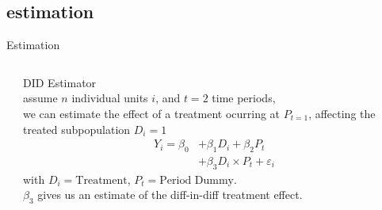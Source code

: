 \documentclass[aspectratio=169]{beamer}
\begin{document}
	\subsection{estimation}
		\begin{frame}{Estimation}
			\begin{columns}
				\begin{column}{0.66\textwidth}
					\begin{center}
					\end{center}
				\end{column}
				\begin{column}{0.33\textwidth}
					DID Estimator \\ \vspace*{.25cm}
					\footnotesize assume $n$ individual units $i$, and $t=2$ time periods, \\
					we can estimate the effect of a treatment ocurring at $P_{t=1}$,
					affecting the treated subpopulation $D_i=1$
					\begin{equation}
						\begin{split}
							Y_{i} = \beta_0 & + \beta_1 D_i + \beta_2 P_t \\
											& + \beta_3 D_i \times P_t + \varepsilon_{i}
						\end{split}
					\end{equation}
					\scriptsize{with $D_i = \text{Treatment}$, $P_t = \text{Period Dummy}$. \\ \vspace*{.25cm}
					\footnotesize $\beta_3$ gives us an estimate of the diff-in-diff treatment effect.}
				\end{column}
			\end{columns}
		\end{frame}

\end{document}
